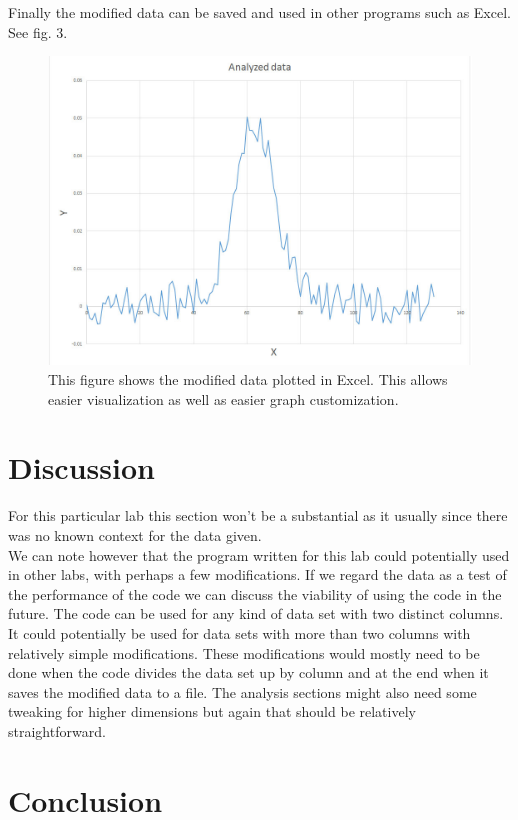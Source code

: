 \documentclass{article}
\begin{document}
Finally the modified data can be saved and used in other programs such as Excel.  See fig. 3.

\begin{figure}[h!]
\includegraphics[scale=.95]{Lab1_Plot.jpg}
\caption{This figure shows the modified data plotted in Excel.  This allows easier visualization as well as easier graph customization.}
\end{figure}

\newpage

\section{Discussion}
For this particular lab this section won't be a substantial as it usually since there was no known context for the data given. 
\\
We can note however that the program written for this lab could potentially used in other labs, with perhaps a few modifications.  If we regard the data as a test of the performance of the code we can discuss the viability of using the code in the future.  The code can be used for any kind of data set with two distinct columns.  It could potentially be used for data sets with more than two columns with relatively simple modifications.  These modifications would mostly need to be done when the code divides the data set up by column and at the end when it saves the modified data to a file.  The analysis sections might also need some tweaking for higher dimensions but again that should be relatively straightforward.  

\section{Conclusion}
\end{document}
